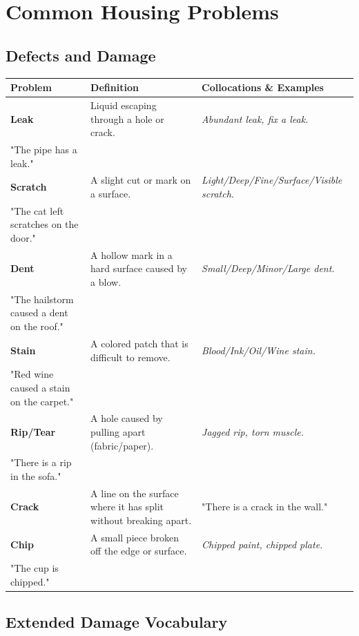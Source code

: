 \section{Common Housing Problems}

\subsection{Defects and Damage}

\begin{table}[h]
\centering
\begin{tabular}{|l|p{5cm}|p{5cm}|}
\hline
\textbf{Problem} & \textbf{Definition} & \textbf{Collocations \& Examples} \\
\hline
\textbf{Leak} & Liquid escaping through a hole or crack. & \textit{Abundant leak, fix a leak.}\\ "The pipe has a leak." \\
\hline
\textbf{Scratch} & A slight cut or mark on a surface. & \textit{Light/Deep/Fine/Surface/Visible scratch.}\\ "The cat left scratches on the door." \\
\hline
\textbf{Dent} & A hollow mark in a hard surface caused by a blow. & \textit{Small/Deep/Minor/Large dent.}\\ "The hailstorm caused a dent on the roof." \\
\hline
\textbf{Stain} & A colored patch that is difficult to remove. & \textit{Blood/Ink/Oil/Wine stain.}\\ "Red wine caused a stain on the carpet." \\
\hline
\textbf{Rip/Tear} & A hole caused by pulling apart (fabric/paper). & \textit{Jagged rip, torn muscle.}\\ "There is a rip in the sofa." \\
\hline
\textbf{Crack} & A line on the surface where it has split without breaking apart. & "There is a crack in the wall." \\
\hline
\textbf{Chip} & A small piece broken off the edge or surface. & \textit{Chipped paint, chipped plate.}\\ "The cup is chipped." \\
\hline
\end{tabular}
\end{table}

\subsection{Extended Damage Vocabulary}

